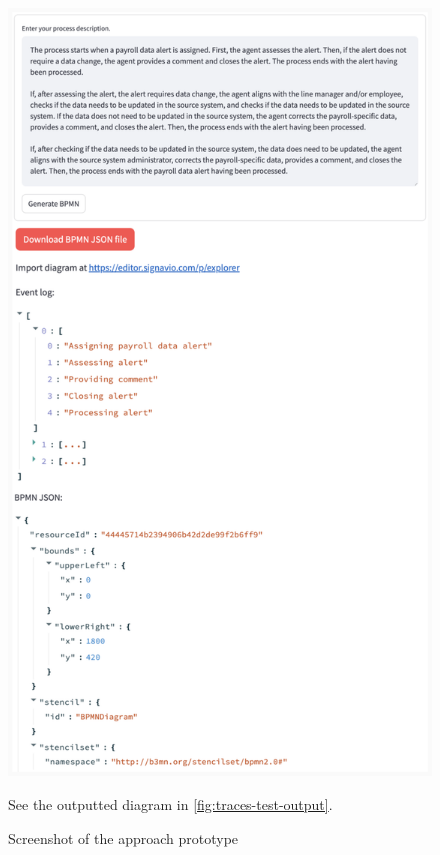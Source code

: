 \begin{figure}[h]
    \centering
    \includegraphics[height=0.95\textheight,keepaspectratio]{../assets/images/Trace prototype.png}
    \caption{Screenshot of the  approach prototype}
    \label{fig:trace-prototype}

    \medskip
    \small
    See the outputted diagram in \autoref{fig:traces-test-output}.
\end{figure}

